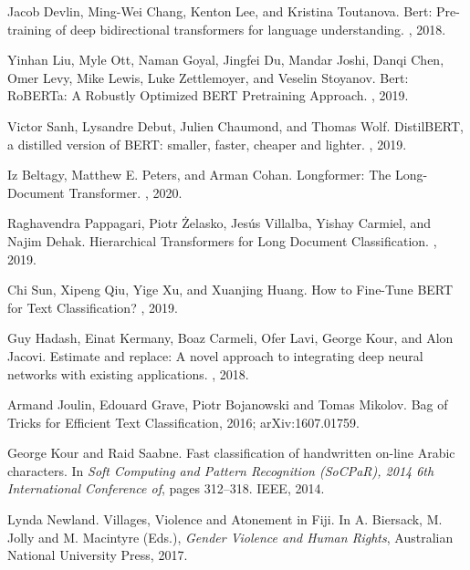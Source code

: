 \documentclass[twocolumn,10pt]{wmrDoc}
\begin{document}
\begin{thebibliography}{1}

Jacob Devlin, Ming-Wei Chang, Kenton Lee, and Kristina Toutanova.
\newblock Bert: Pre-training of deep bidirectional transformers for language understanding.
, 2018.

Yinhan Liu, Myle Ott, Naman Goyal, Jingfei Du, Mandar Joshi, Danqi Chen, Omer Levy, Mike Lewis, Luke Zettlemoyer, and Veselin Stoyanov.
\newblock Bert: RoBERTa: A Robustly Optimized BERT Pretraining Approach.
, 2019.

Victor Sanh, Lysandre Debut, Julien Chaumond, and Thomas Wolf.
\newblock DistilBERT, a distilled version of BERT: smaller, faster, cheaper and lighter.
, 2019.

Iz Beltagy, Matthew E. Peters, and Arman Cohan.
\newblock Longformer: The Long-Document Transformer.
, 2020.

Raghavendra Pappagari, Piotr Żelasko, Jesús Villalba, Yishay Carmiel, and Najim Dehak.
\newblock Hierarchical Transformers for Long Document Classification.
, 2019.

Chi Sun, Xipeng Qiu, Yige Xu, and Xuanjing Huang.
\newblock How to Fine-Tune BERT for Text Classification?
, 2019.

Guy Hadash, Einat Kermany, Boaz Carmeli, Ofer Lavi, George Kour, and Alon
  Jacovi.
\newblock Estimate and replace: A novel approach to integrating deep neural
  networks with existing applications.
, 2018.

Armand Joulin, Edouard Grave, Piotr Bojanowski and Tomas Mikolov.
\newblock Bag of Tricks for Efficient Text Classification, 2016;
\newblock arXiv:1607.01759.

George Kour and Raid Saabne.
\newblock Fast classification of handwritten on-line Arabic characters.
\newblock In {\em Soft Computing and Pattern Recognition (SoCPaR), 2014 6th
  International Conference of}, pages 312--318. IEEE, 2014.

Lynda Newland.
\newblock Villages, Violence and Atonement in Fiji.
\newblock In A. Biersack, M. Jolly and M. Macintyre (Eds.), {\em Gender Violence and Human Rights}, Australian National University Press, 2017.


\end{thebibliography}
\end{document}
